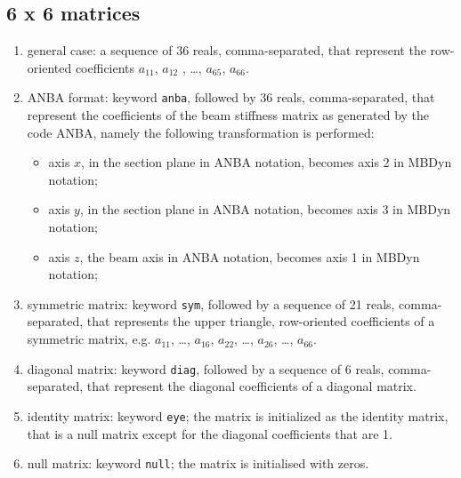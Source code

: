 \subsection{6 x 6 matrices}
\begin{enumerate}
    \item general case: a sequence of 36 reals, comma-separated, that
    represent the row-oriented coefficients $ a_{11} $, $ a_{12}$ ,
    \ldots, $ a_{65} $, $ a_{66} $.
    \item ANBA format: keyword \texttt{anba}, followed by 36 reals, 
    comma-separated, that represent the coefficients of the beam stiffness
    matrix as generated by the code ANBA, namely the following
    transformation is performed:
    \begin{itemize}
        \item axis $ x $, in the section plane in ANBA notation, 
	becomes axis 2 in MBDyn notation;    
	\item axis $ y $, in the section plane in ANBA notation, 
	becomes axis 3 in MBDyn notation;    
	\item axis $ z $, the beam axis in ANBA notation, 
	becomes axis 1 in MBDyn notation;    
    \end{itemize}
    \item symmetric matrix: keyword \texttt{sym}, followed by a sequence
    of 21 reals, comma-separated, that represents the upper triangle,
    row-oriented coefficients of a symmetric matrix, 
    e.g. $ a_{11} $, \ldots , $ a_{16} $, $ a_{22} $,
    \ldots , $ a_{26} $, \ldots, $ a_{66} $.
    \item diagonal matrix: keyword \texttt{diag}, followed by a sequence
    of 6 reals, comma-separated, that represent the diagonal coefficients 
    of a diagonal matrix.
    \item identity matrix: keyword \texttt{eye}; the matrix is initialized
    as the identity matrix, that is a null matrix except for the diagonal 
    coefficients that are 1.
    \item null matrix: keyword \texttt{null}; the matrix is initialised 
    with zeros.
\end{enumerate}
